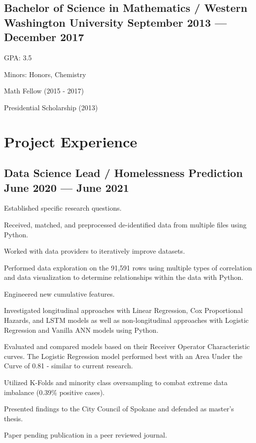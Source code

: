 \documentclass[letter,10pt]{article}
\begin{document}
\subsection{{Bachelor of Science in Mathematics / Western Washington University \hfill September 2013 --- December 2017}}
\begin{zitemize}
    \item GPA: 3.5
    \item Minors: Honors, Chemistry
    \item Math Fellow (2015 - 2017)
    \item Presidential Scholarship (2013)
\end{zitemize}

\section{Project Experience}
\subsection{{Data Science Lead / Homelessness Prediction \hfill June 2020 --- June 2021}}
\begin{zitemize}
    \item Established specific research questions.
    \item Received, matched, and preprocessed de-identified data from multiple files using Python.
    \item Worked with data providers to iteratively improve datasets.
    \item Performed data exploration on the 91,591 rows using multiple types of correlation and data visualization to determine relationships within the data with Python.
    \item Engineered new cumulative features.
    \item Investigated longitudinal approaches with Linear Regression, Cox Proportional Hazards, and LSTM models as well as non-longitudinal approaches with Logistic Regression and Vanilla ANN models using Python.
    \item Evaluated and compared models based on their Receiver Operator Characteristic curves. The Logistic Regression model performed best with an Area Under the Curve of 0.81 - similar to current research.
    \item Utilized K-Folds and minority class oversampling to combat extreme data imbalance (0.39\% positive cases).
    \item Presented findings to the City Council of Spokane and defended as master's thesis. 
    \item Paper pending publication in a peer reviewed journal.
\end{zitemize}
\end{document}
